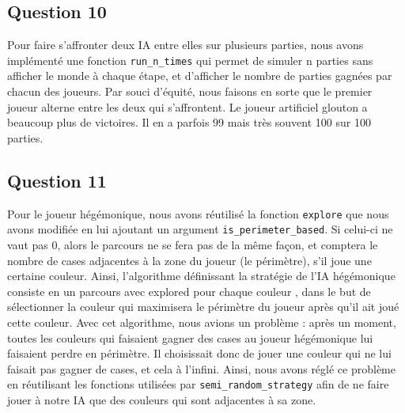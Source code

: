 \documentclass{article}
\begin{document}
\subsection{Question 10}
    Pour faire s'affronter deux IA entre elles sur plusieurs parties, nous avons implémenté une fonction \texttt{run\_n\_times} qui permet de simuler n parties sans afficher le monde à chaque étape, et d'afficher le nombre de parties gagnées par chacun des joueurs. Par souci d'équité, nous faisons en sorte que le premier joueur alterne entre les deux qui s'affrontent. Le joueur artificiel glouton a beaucoup plus de victoires. Il en a parfois 99 mais très souvent 100 sur 100 parties.
\subsection{Question 11}
    Pour le joueur hégémonique, nous avons réutilisé la fonction \texttt{explore} que nous avons modifiée en lui ajoutant un argument \texttt{is\_perimeter\_based}. Si celui-ci ne vaut pas 0, alors le parcours ne se fera pas de la même façon, et comptera le nombre de cases adjacentes à la zone du joueur (le périmètre), s'il joue une certaine couleur. Ainsi, l'algorithme définissant la stratégie de l'IA hégémonique consiste en un parcours avec explored pour chaque couleur , dans le but de sélectionner la couleur qui maximisera le périmètre du joueur après qu'il ait joué cette couleur. Avec cet algorithme, nous avions un problème : après un moment, toutes les couleurs qui faisaient gagner des cases au joueur hégémonique lui faisaient perdre en périmètre. Il choisissait donc de jouer une couleur qui ne lui faisait pas gagner de cases, et cela à l'infini. Ainsi, nous avons réglé ce problème en réutilisant les fonctions utilisées par \texttt{semi\_random\_strategy} afin de ne faire jouer à notre IA que des couleurs qui sont adjacentes à sa zone.
\end{document}
